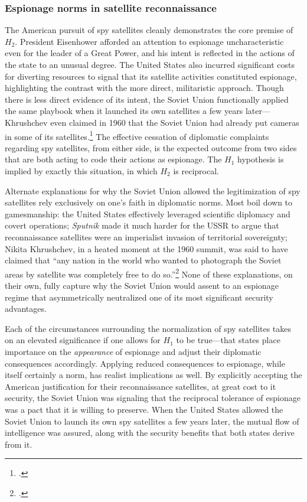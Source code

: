 \documentclass[12pt]{extarticle}
\begin{document}
\subsubsection{Espionage norms in satellite reconnaissance}
The American pursuit of spy satellites cleanly demonstrates the core premise of $H_2$. President Eisenhower afforded an attention to espionage uncharacteristic even for the leader of a Great Power, and his intent is reflected in the actions of the state to an unusual degree. The United States also incurred significant costs for diverting resources to signal that its satellite activities constituted espionage, highlighting the contrast with the more direct, militaristic approach. Though there is less direct evidence of its intent, the Soviet Union functionally applied the same playbook when it launched its own satellites a few years later---Khrushchev even claimed in 1960 that the Soviet Union had already put cameras in some of its satellites.\footcite[353. As far as we know, these camera-equipped satellites, if they actually existed, were not successful enough to be considered spy satellites.]{brugioni_eyes_2010} The effective cessation of diplomatic complaints regarding spy satellites, from either side, is the expected outcome from two sides that are both acting to code their actions as espionage. The $H_1$ hypothesis is implied by exactly this situation, in which $H_2$ is reciprocal.

Alternate explanations for why the Soviet Union allowed the legitimization of spy satellites rely exclusively on one's faith in diplomatic norms. Most boil down to gamesmanship: the United States effectively leveraged scientific diplomacy and covert operations; \emph{Sputnik} made it much harder for the USSR to argue that reconnaissance satellites were an imperialist invasion of territorial sovereignty; Nikita Khrushchev, in a heated moment at the 1960 summit, was said to have claimed that ``any nation in the world who wanted to photograph the Soviet areas by satellite was completely free to do so.''\footcite[556]{eisenhower_waging_1965} None of these explanations, on their own, fully capture why the Soviet Union would assent to an espionage regime that asymmetrically neutralized one of its most significant security advantages.

Each of the circumstances surrounding the normalization of spy satellites takes on an elevated significance if one allows for $H_1$ to be true---that states place importance on the \emph{appearance} of espionage and adjust their diplomatic consequences accordingly. Applying reduced consequences to espionage, while itself certainly a norm, has realist implications as well. By explicitly accepting the American justification for their reconnaissance satellites, at great cost to it security, the Soviet Union was signaling that the reciprocal tolerance of espionage was a pact that it is willing to preserve. When the United States allowed the Soviet Union to launch its own spy satellites a few years later, the mutual flow of intelligence was assured, along with the security benefits that both states derive from it.
\end{document}
